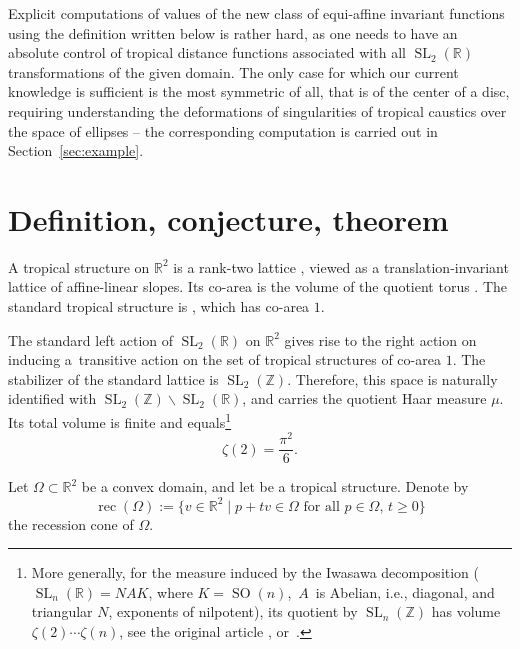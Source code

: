 \documentclass[pdftex]{sigma}
\numberwithin{equation}{section}
\theoremstyle{definition}
\begin{document}
Explicit computations of values of the new class of equi-affine invariant functions using the definition written below is rather hard, as one needs to have an absolute control of tropical distance functions associated with all $\operatorname{SL}_2(\mathbb{R})$ transformations of the given domain. The only case for which our current knowledge is sufficient is the most symmetric of all, that is of the center of a disc, requiring understanding the deformations of singularities of tropical caustics over the space of ellipses -- the corresponding computation is carried out in Section~\ref{sec:example}.


\section{Definition, conjecture, theorem}

A tropical structure on $\mathbb{R}^2$ is a rank-two lattice , viewed as a translation-invariant lattice of affine-linear slopes. Its co-area is the volume of the quotient torus . The standard tropical structure is , which has co-area $1$.

The standard left action of $\operatorname{SL}_2(\mathbb{R})$ on $\mathbb{R}^2$ gives rise to the right action on  inducing a~transitive action on the set of tropical structures of co-area $1$. The stabilizer of the standard lattice is $\operatorname{SL}_2(\mathbb{Z})$. Therefore, this space is naturally identified with
$\operatorname{SL}_2(\mathbb{Z})\backslash \operatorname{SL}_2(\mathbb{R})$,
and carries the quotient Haar measure $\mu$.
Its total volume is finite and equals\footnote{More generally, for the measure induced by the Iwasawa decomposition ($\operatorname{SL}_n(\mathbb{R})=NAK$, where ${K=\operatorname{SO}(n)}$,~$A$~is Abelian, i.e., diagonal, and triangular $N$, exponents of nilpotent), its quotient by $\operatorname{SL}_n(\mathbb{Z})$ has volume $\zeta(2)\cdots\zeta(n)$, see the original article \cite{siegel}, or~\cite{garrett}.}
\[
\zeta(2)=\frac{\pi^2}{6}.
\]

Let $\Omega \subset \mathbb{R}^2$ be a convex domain, and let  be a tropical structure. Denote by
\[
\operatorname{rec}(\Omega):=\bigl\{v\in \mathbb{R}^2 \mid p+tv\in \Omega \text{ for all } p\in \Omega,\, t\ge 0\bigr\}
\]
the recession cone of $\Omega$.
\end{document}
